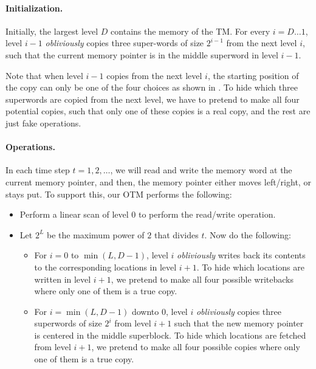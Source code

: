 \documentclass[11pt]{article}
\begin{document}
\paragraph{Initialization.}
Initially, the largest level $D$ contains  
the memory of the TM.
For every $i = D \ldots 1$, 
level $i-1$ {\it obliviously} copies three super-words  
of size $2^{i-1}$
from the next level $i$, such that 
the current memory pointer 
is in the middle superword 
in level $i-1$.

Note that when level $i-1$ copies from the next level $i$,
the starting position of the copy can only be one of the four choices
as shown in .
To hide which three superwords are copied from the next level,
we have to pretend to 
make all four potential copies, such that only one of these
copies is a real copy, and the rest are just fake operations.


\paragraph{Operations.}
In each time step $t = 1, 2, \ldots$, 
we will read and write the memory word 
at the current memory pointer, and then, 
the memory pointer either moves left/right, or stays put.
To support this, our OTM performs the following:

\begin{itemize}[leftmargin=5mm]
\item 
Perform a linear scan of level $0$ to perform the read/write operation.
\item 
Let $2^L$ be the maximum power of  
$2$ that divides $t$.
Now do the following: 
\begin{itemize}[leftmargin=5mm]
\item 
For $i = 0$ to $\min(L, D-1)$,  
level $i$ {\it obliviously} 
writes back its contents to the corresponding locations 
in level $i+1$. 
To hide which locations are written in level $i+1$, we pretend
to make all four possible writebacks where only one of them is a true
copy. 
\item 
For $i = \min(L, D-1)$ downto $0$,  
level $i$ 
{\it obliviously} copies three superwords of size $2^i$
from level $i+1$ such that 
the new memory pointer is centered  
in the middle superblock.
To hide which locations are fetched from level $i+1$, we pretend
to make all four possible copies where only one of them is a true
copy. 
\end{itemize}
\end{itemize}
\end{document}
